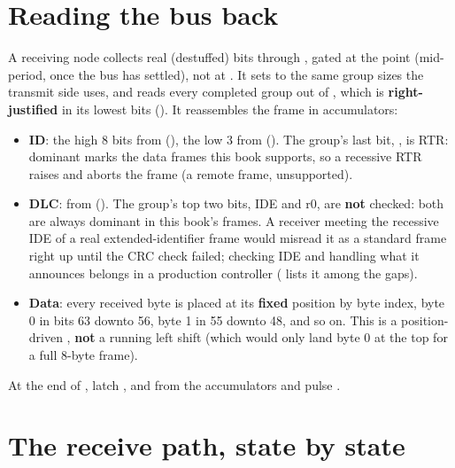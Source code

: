 
\section{Reading the bus back}
\label{c17:sec:readback}

A receiving node collects real (destuffed) bits through , gated at the
 point (mid-period, once the bus has settled), not at . It sets
 to the same group sizes the transmit side uses, and reads every
completed group out of , which is \textbf{right-justified} in its lowest
 bits (). It reassembles the frame in accumulators:
\begin{itemize}
  \item \textbf{ID}: the high 8 bits from  (), the low 3
    from  (). The group's last bit, , is
    RTR: dominant marks the data frames this book supports, so a recessive RTR raises 
    and aborts the frame (a remote frame, unsupported).
  \item \textbf{DLC}: from  (). The group's top two bits, IDE
    and r0, are \textbf{not} checked: both are always dominant in this book's frames. A receiver
    meeting the recessive IDE of a real extended-identifier frame would misread it as a standard frame
    right up until the CRC check failed; checking IDE and handling what it announces belongs in a
    production controller ( lists it among the gaps).
  \item \textbf{Data}: every received byte is placed at its \textbf{fixed} position by byte index,
    byte 0 in bits 63 downto 56, byte 1 in 55 downto 48, and so on. This is a position-driven
    , \textbf{not} a running left shift (which would only land byte 0 at the top for a
    full 8-byte frame).
\end{itemize}

At the end of , latch ,  and  from the
accumulators and pulse .

\section{The receive path, state by state}
\label{c17:sec:states}


